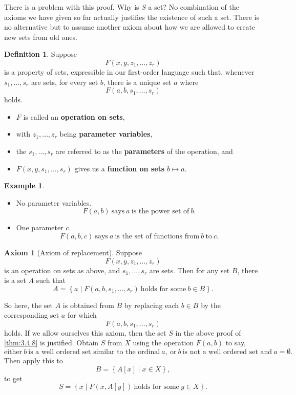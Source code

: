 \documentclass{article}
\newcommand{\rb}[1]{\left( #1 \right)}
\renewcommand{\sb}[1]{\left[ #1 \right]}
\newcommand{\cb}[1]{\left\{ #1 \right\}}
\theoremstyle{definition}\newtheorem{definition}{Definition}[subsection]
\theoremstyle{definition}\newtheorem{remark1}[definition]{Remark}
\theoremstyle{definition}\newtheorem{example1}[definition]{Example}
\theoremstyle{definition}\newtheorem*{remark2}{Remark}
\theoremstyle{definition}\newtheorem*{example2}{Example}
\theoremstyle{definition}\newtheorem*{note}{Note}
\theoremstyle{definition}\newtheorem*{notation}{Notation}
\newtheorem{axiom}{Axiom}
\begin{document}
There is a problem with this proof. Why is $ S $ a set? No combination of the axioms we have given so far actually justifies the existence of such a set. There is no alternative but to assume another axiom about how we are allowed to create new sets from old ones.

\pagebreak

\begin{definition}
\label{def:3.4.9}
Suppose
$$ F\rb{x, y, z_1, \dots, z_r} $$
is a property of sets, expressible in our first-order language such that, whenever $ s_1, \dots, s_r $ are sets, for every set $ b $, there is a unique set $ a $ where
$$ F\rb{a, b, s_1, \dots, s_r} $$
holds.
\begin{itemize}
\item $ F $ is called an \textbf{operation on sets},
\item with $ z_1, \dots, z_r $ being \textbf{parameter variables},
\item the $ s_1, \dots, s_r $ are referred to as the \textbf{parameters} of the operation, and
\item $ F\rb{x, y, s_1, \dots, s_r} $ gives us a \textbf{function on sets} $ b \mapsto a $.
\end{itemize}
\end{definition}

\begin{example2}
\hfill
\begin{itemize}
\item No parameter variables.
$$ F\rb{a, b} \ \text{says} \ a \ \text{is the power set of} \ b. $$
\item One parameter $ c $.
$$ F\rb{a, b, c} \ \text{says} \ a \ \text{is the set of functions from} \ b \ \text{to} \ c. $$
\end{itemize}
\end{example2}

\begin{axiom}[Axiom of replacement]
Suppose
$$ F\rb{x, y, z_1, \dots, z_r} $$
is an operation on sets as above, and $ s_1, \dots, s_r $ are sets. Then for any set $ B $, there is a set $ A $ such that
$$ A = \cb{a \mid F\rb{a, b, s_1, \dots, s_r} \ \text{holds for some} \ b \in B}. $$
\end{axiom}

So here, the set $ A $ is obtained from $ B $ by replacing each $ b \in B $ by the corresponding set $ a $ for which
$$ F\rb{a, b, s_1, \dots, s_r} $$
holds. If we allow ourselves this axiom, then the set $ S $ in the above proof of \ref{thm:3.4.8} is justified. Obtain $ S $ from $ X $ using the operation $ F\rb{a, b} $ to say,
$$ \text{either} \ b \ \text{is a well ordered set similar to the ordinal} \ a, \ \text{or} \ b \ \text{is not a well ordered set and} \ a = \emptyset. $$
Then apply this to
$$ B = \cb{A\sb{x} \mid x \in X}, $$
to get
$$ S = \cb{x \mid F\rb{x, A\sb{y}} \ \text{holds for some} \ y \in X}. $$
\end{document}
